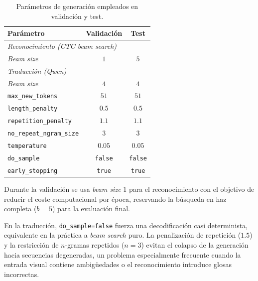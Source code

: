 \begin{table}[H]
	\centering
	\begin{tabular}{lcc}
		\hline
		\textbf{Parámetro}                & \textbf{Validación} & \textbf{Test} \\ \hline
		\multicolumn{3}{l}{\textit{Reconocimiento (CTC beam search)}}          \\
		\hspace{1em}\textit{Beam size}    & $1$                   & $5$             \\ \hline
		\multicolumn{3}{l}{\textit{Traducción (Qwen)}}                         \\
		\hspace{1em}\textit{Beam size}    & $4$                   & $4$             \\
		\hspace{1em}\texttt{max\_new\_tokens}      & $51$         & $51$            \\
		\hspace{1em}\texttt{length\_penalty}       & $0.5$        & $0.5$           \\
		\hspace{1em}\texttt{repetition\_penalty}   & $1.1$        & $1.1$          \\
		\hspace{1em}\texttt{no\_repeat\_ngram\_size} & $3$        & $3$             \\
		\hspace{1em}\texttt{temperature}           & $0.05$       & $0.05$          \\
		\hspace{1em}\texttt{do\_sample}            & \texttt{false} & \texttt{false} \\
		\hspace{1em}\texttt{early\_stopping}       & \texttt{true}  & \texttt{true}  \\ \hline
		\end{tabular}
		\caption{Parámetros de generación empleados en validación y test.}
	\label{tab:gen_params}
\end{table}

Durante la validación se usa \textit{beam size} $1$ para el reconocimiento con el objetivo de reducir el coste computacional por época, reservando la búsqueda en haz completa ($b=5$) para la evaluación final.

En la traducción, \texttt{do\_sample=false} fuerza una decodificación casi determinista, equivalente en la práctica a \textit{beam search} puro.
La penalización de repetición ($1.5$) y la restricción de $n$-gramas repetidos ($n=3$) evitan el colapso de la generación hacia secuencias degeneradas, un problema especialmente frecuente cuando la entrada visual contiene ambigüedades o el reconocimiento introduce glosas incorrectas.

